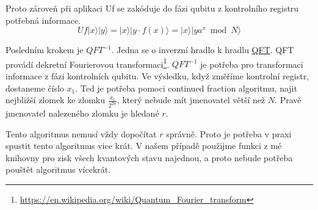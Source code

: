 \documentclass[11pt]{article}
\begin{document}
Proto zároveň při aplikaci Uf se zakóduje do fázi qubitu z kontrolního registru potřebná informace.
$$Uf|x\rangle|y\rangle = |x\rangle|y \cdot f(x)\rangle = |x\rangle|ya^x \bmod N \rangle$$
\par Posledním krokem je $QFT^{-1}$.
Jedna se o inverzní hradlo k hradlu \hyperref[sec:qft]{QFT}.
QFT provádí dekretní Fourierovou transformaci\footnote{\url{https://en.wikipedia.org/wiki/Quantum_Fourier_transform}}.
$QFT^{-1}$ je potřeba pro transformaci informace z fázi kontrolních qubitu.
Ve výsledku, když změříme kontrolní registr, dostaneme číslo $x_1$.
Ted je potřeba pomoci continued fraction algoritmu, najit nejbližší zlomek ke zlomku $\frac{x_1}{2^{2n}}$, který nebude mít jmenovatel větší než $N$.
Pravě jmenovatel nalezeného zlomku je hledané $r$.
\par Tento algoritmus nemusí vždy dopočítat $r$ správně.
Proto je potřeba v praxi spustit tento algoritmus vice krát.
V našem případě použijme funkci z mé knihovny pro zisk všech kvantových stavu najednou, a proto nebude potřeba pouštět algoritmus vícekrát.
\end{document}
